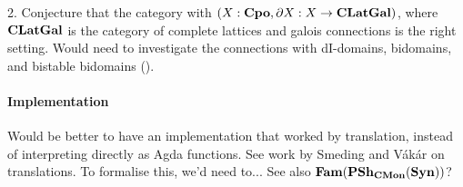 2. Conjecture that the category with $(X : \mathbf{Cpo}, \partial X : X \to \mathbf{CLatGal})$, where $\mathbf{CLatGal}$ is the category of complete lattices and galois connections is the right setting. Would need to investigate the connections with dI-domains, bidomains, and bistable bidomains (\cite{laird07}).

\paragraph{Implementation}

Would be better to have an implementation that worked by translation,
instead of interpreting directly as Agda functions. See work by
Smeding and Vákár on translations. To formalise this, we'd need
to... See also $\mathbf{Fam}(\mathbf{PSh}_{\mathbf{CMon}}(\mathbf{Syn}))$?
